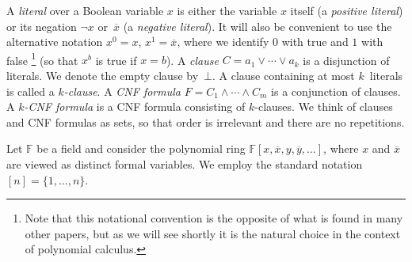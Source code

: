 \documentclass[11pt]{article}
\numberwithin{equation}{section}
\theoremstyle{definition}
\theoremstyle{plain}
\theoremstyle{plain}
\theoremstyle{definition}
\newcommand{\formuladots}{\cdots}
\newcommand{\fieldstd}{\mathbb{F}}
\newcommand{\set}[1]{\{ #1 \}}
\newcommand{\olnot}[1]{\overline{#1}}
\newcommand{\clwidth}{k}
\newcommand{\xcnfform}[1]{\mbox{\ensuremath{#1}-CNF} formula\xspace}
\newcommand{\kcnfform}{\xcnfform{\clwidth}}
\newcommand{\xclause}[1]{\mbox{\ensuremath{#1}-clause}\xspace}
\newcommand{\introduceterm}[1]{{\emph{#1}}}
\newcommand{\emptycl}{\bot}
\newcommand{\formf}{\ensuremath{F}}
\newcommand{\varx}{\ensuremath{x}}
\newcommand{\lita}{\ensuremath{a}}
\newcommand{\clc}{\ensuremath{C}}
\newcommand{\fstd}{\formf}
\newcommand{\numset}[1]{[#1]}
\begin{document}
A \introduceterm{literal} over a Boolean variable $\varx$ is either
the variable 
$\varx$ itself (a 
\introduceterm{positive  literal})
or its negation $\lnot \varx$ or~$\olnot{\varx}$ (a
\introduceterm{negative literal}). It will also be convenient to use
the alternative notation $\varx^0=\varx$, $\varx^1=\olnot{\varx}$,
where we identify $0$ with true and $1$ with false%
\footnote{Note that 
this notational convention is 
the opposite of what is found in many other papers, but as we will see
shortly it is the natural choice in the  context of polynomial
calculus.} 
(so that $\varx^b$ is true if $\varx = b$).
%
A \introduceterm{clause} $\clc = \lita_1 \lor \formuladots \lor
\lita_{\clwidth}$ is a disjunction of literals. We denote the empty
clause by~$\emptycl$.  A clause containing at most $\clwidth$~literals
is called a \introduceterm{$\clwidth$\nobreakdash-clause}. A
\introduceterm{CNF formula} $\fstd = \clc_1 \land \formuladots \land
\clc_m$ is a conjunction of clauses. A \introduceterm{\kcnfform{}} is
a CNF formula consisting of \xclause{\clwidth}{}s.
We think of clauses and CNF formulas as sets, %
so that order is irrelevant  and there %
are   %
no repetitions.

Let $\fieldstd$ be a 
%
field and consider the polynomial ring
$\fieldstd[x, \olnot{x}, y, \olnot{y}, \ldots]$,
%
where 
$x$
and
$\olnot{x}$
are viewed
as distinct formal 
variables. 
%
We employ the standard notation $\numset{n} =
\set{1,\ldots,n}$.
\end{document}
